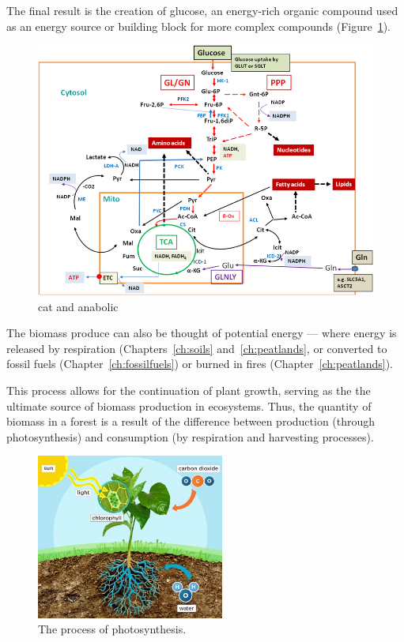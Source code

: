 The final result is the creation of glucose, an energy-rich organic compound used as an energy source or building block for more complex compounds (Figure~\ref{fig:Major-catabolic-and-anabolic-pathways-in-mammalian}). 
  
\begin{figure}
	\centering
\includegraphics[width=1.00\textwidth]{graphics/Major-catabolic-and-anabolic-pathways-in-mammalian.png}
	\caption{cat and anabolic}
	\label{fig:Major-catabolic-and-anabolic-pathways-in-mammalian}
\end{figure}

    
The biomass produce can also be thought of potential energy --- where energy is released by respiration (Chapters~\ref{ch:soils} and~\ref{ch:peatlands}, or converted to fossil fuels (Chapter~\ref{ch:fossilfuels}) or burned in fires (Chapter~\ref{ch:peatlands}). 

This process allows for the continuation of plant growth, serving as the the ultimate source of biomass production in ecosystems. Thus, the quantity of biomass in a forest is a result of the difference between production (through photosynthesis) and consumption (by respiration and harvesting processes).

  \begin{figure}[ht]
    \centering
        \includegraphics[width = 0.55\textwidth]{graphics/photosynthesis.jpg}
        \caption{The process of photosynthesis.}
    \end{figure}
    

